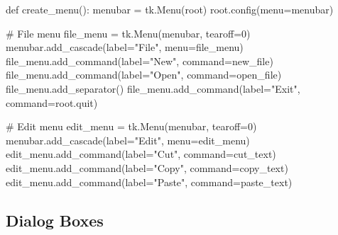 \documentclass[
  letterpaper,
  DIV=11,
  numbers=noendperiod,
  oneside]{scrreprt}
\newenvironment{Shaded}{}{}
\newcommand{\CommentTok}[1]{\textcolor[rgb]{0.42,0.45,0.49}{#1}}
\newcommand{\DecValTok}[1]{\textcolor[rgb]{0.00,0.36,0.77}{#1}}
\newcommand{\KeywordTok}[1]{\textcolor[rgb]{0.84,0.23,0.29}{#1}}
\newcommand{\NormalTok}[1]{\textcolor[rgb]{0.14,0.16,0.18}{#1}}
\newcommand{\OperatorTok}[1]{\textcolor[rgb]{0.14,0.16,0.18}{#1}}
\newcommand{\StringTok}[1]{\textcolor[rgb]{0.01,0.18,0.38}{#1}}
\begin{document}
\begin{Shaded}
\begin{Highlighting}[]
\KeywordTok{def}\NormalTok{ create\_menu():}
\NormalTok{    menubar }\OperatorTok{=}\NormalTok{ tk.Menu(root)}
\NormalTok{    root.config(menu}\OperatorTok{=}\NormalTok{menubar)}
    
    \CommentTok{\# File menu}
\NormalTok{    file\_menu }\OperatorTok{=}\NormalTok{ tk.Menu(menubar, tearoff}\OperatorTok{=}\DecValTok{0}\NormalTok{)}
\NormalTok{    menubar.add\_cascade(label}\OperatorTok{=}\StringTok{"File"}\NormalTok{, menu}\OperatorTok{=}\NormalTok{file\_menu)}
\NormalTok{    file\_menu.add\_command(label}\OperatorTok{=}\StringTok{"New"}\NormalTok{, command}\OperatorTok{=}\NormalTok{new\_file)}
\NormalTok{    file\_menu.add\_command(label}\OperatorTok{=}\StringTok{"Open"}\NormalTok{, command}\OperatorTok{=}\NormalTok{open\_file)}
\NormalTok{    file\_menu.add\_separator()}
\NormalTok{    file\_menu.add\_command(label}\OperatorTok{=}\StringTok{"Exit"}\NormalTok{, command}\OperatorTok{=}\NormalTok{root.quit)}
    
    \CommentTok{\# Edit menu}
\NormalTok{    edit\_menu }\OperatorTok{=}\NormalTok{ tk.Menu(menubar, tearoff}\OperatorTok{=}\DecValTok{0}\NormalTok{)}
\NormalTok{    menubar.add\_cascade(label}\OperatorTok{=}\StringTok{"Edit"}\NormalTok{, menu}\OperatorTok{=}\NormalTok{edit\_menu)}
\NormalTok{    edit\_menu.add\_command(label}\OperatorTok{=}\StringTok{"Cut"}\NormalTok{, command}\OperatorTok{=}\NormalTok{cut\_text)}
\NormalTok{    edit\_menu.add\_command(label}\OperatorTok{=}\StringTok{"Copy"}\NormalTok{, command}\OperatorTok{=}\NormalTok{copy\_text)}
\NormalTok{    edit\_menu.add\_command(label}\OperatorTok{=}\StringTok{"Paste"}\NormalTok{, command}\OperatorTok{=}\NormalTok{paste\_text)}
\end{Highlighting}
\end{Shaded}

\subsection{Dialog Boxes}\label{dialog-boxes}
\end{document}

